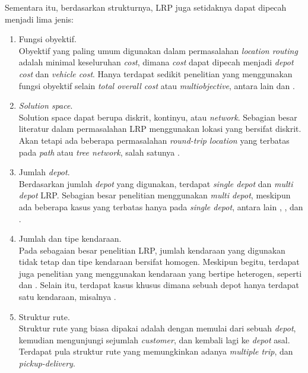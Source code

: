 Sementara itu, berdasarkan strukturnya, LRP juga setidaknya dapat dipecah menjadi lima jenis:
\begin{enumerate}
\item Fungsi obyektif. \\
	Obyektif yang paling umum digunakan dalam permasalahan \textit{location routing} adalah minimal keseluruhan \textit{cost}, dimana \textit{cost} dapat dipecah menjadi \textit{depot cost} dan \textit{vehicle cost}. Hanya terdapat sedikit penelitian yang menggunakan fungsi obyektif selain \textit{total overall cost} atau \textit{multiobjective}, antara lain \citep{averbakh_technical_1994} dan \citep{averbakh_probabilistic_1995}.
\item \textit{Solution space}. \\
	Solution space dapat berupa diskrit, kontinyu, atau \textit{network}. Sebagian besar literatur dalam permasalahan LRP menggunakan lokasi yang bersifat diskrit. Akan tetapi ada beberapa permasalahan \textit{round-trip location} yang terbatas pada \textit{path} atau \textit{tree network}, salah satunya \citep{simchi-levi_capacitated_1991}.
\item  Jumlah \textit{depot}. \\
	Berdasarkan jumlah \textit{depot} yang digunakan, terdapat \textit{single depot} dan \textit{multi depot} LRP. Sebagian besar penelitian menggunakan \textit{multi depot}, meskipun ada beberapa kasus yang terbatas hanya pada \textit{single depot}, antara lain \citep{laporte_exact_1981}, \citep{averbakh_technical_1994}, dan \citep{simchi-levi_capacitated_1991}. 
\item Jumlah dan tipe kendaraan. \\
	Pada sebagaian besar penelitian LRP, jumlah kendaraan yang digunakan tidak tetap dan tipe kendaraan bersifat homogen. Meskipun begitu, terdapat juga penelitian yang menggunakan kendaraan yang bertipe heterogen, seperti \citep{bookbinder_vehicle_1988} dan \citep{salhi_intergrated_1996}. Selain itu, terdapat kasus khusus dimana sebuah depot hanya terdapat satu kendaraan, misalnya \citep{branco_hamiltonian_1990}.
\item Struktur rute. \\
	Struktur rute yang biasa dipakai adalah dengan memulai dari sebuah \textit{depot}, kemudian mengunjungi sejumlah \textit{customer}, dan kembali lagi ke \textit{depot} asal. Terdapat pula struktur rute yang memungkinkan adanya \textit{multiple trip}, dan \textit{pickup-delivery}.
\end{enumerate}


